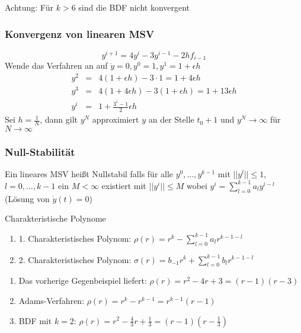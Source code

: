 Achtung: Für $k>6$ sind die BDF nicht konvergent

\subsubsection{Konvergenz von linearen MSV}

\begin{example}
$$y^{i+1}=4y^{i}-3y^{i-1}-2hf_{i-1}$$
Wende das Verfahren an auf $\dot y =0,y^{0}=1,y^{1}=1+\epsilon h$
\begin{eqnarray*}
	y^{2}&=&4(1+\epsilon h)-3\cdot 1 = 1+4\epsilon h\\
	y^{3}&=&4(1+4\epsilon h)-3(1+\epsilon h) = 1+13\epsilon h\\
	y^{i}&=&1+\frac{3^{i}-1}{2}\epsilon h
\end{eqnarray*}
Sei $h=\frac{1}{N}$, dann gilt $y^{N}$ approximiert $y$ an der Stelle $t_{0}+1$ und $y^{N}\rightarrow \infty$ für $N\rightarrow \infty$
\end{example}

\subsubsection{Null-Stabilität}
\begin{definition}
	[Definition IV.8] Ein lineares MSV heißt Nullstabil falls für alle $y^{0},\ldots,y^{k-1}$ mit $||y^{l}||\le 1$, $l=0,\ldots,k-1$ ein
	$M<\infty$ existiert mit $||y^{i}||\le M$ wobei $y^{i}=\sum_{l=0}^{k-1}a_{l}y^{i-l}$ (Lösung von $\dot y(t)=0$)
\end{definition}

\begin{definition}
	[Definition IV.9] Charakteristische Polynome
	\\
	\begin{enumerate}
		\item 1. Charakteristisches Polynom: $\rho(r)=r^{k}-\sum_{l=0}^{k-1}a_{l}r^{k-1-l}$
		\item 2. Charakteristisches Polynom: $\sigma(r)=b_{-1}r^{k}+\sum_{l=0}^{k-1}b_{l}r^{k-1-l}$
	\end{enumerate}
\end{definition}


\begin{example}
	\begin{enumerate}
		\item Das vorherige Gegenbeispiel liefert: $\rho(r)=r^{2}-4r+3=(r-1)(r-3)$
		\item Adams-Verfahren: $\rho(r)=r^{k}-r^{k-1}=r^{k-1}(r-1)$
		\item BDF mit $k=2$: $\rho(r)=r^{2}-\frac{4}{3}r+\frac{1}{3} = (r-1)(r-\frac{1}{3})$
	\end{enumerate}
\end{example}

